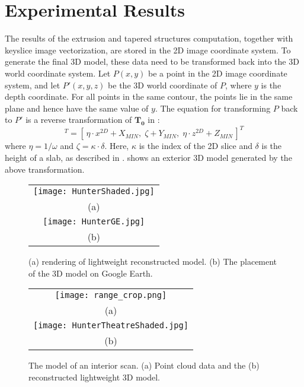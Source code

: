 

\section{Experimental Results}
\label{sec:IR_OUT}

The results of the extrusion and tapered structures computation,
together with keyslice image vectorization, are stored in the 2D
image coordinate system. To generate the final 3D model, these
data need to be transformed back into the 3D world coordinate system.
Let $P(x,y)$ be a point in the 2D image coordinate system, and let $P'(x,y,z)$
be the 3D world coordinate of $P$, where $y$ is the depth coordinate.
For all points in the same contour, the points lie in the same plane and
hence have the same value of $y$.
The equation for transforming $P$ back to $P'$ is a reverse transformation
of $\boldsymbol{T_0}$ in :
\begin{equation}
[\,x^{3D},\; y^{3D},\; z^{3D}\,]^T = [\,\eta\cdot x^{2D} + X_{MIN},\; \zeta + Y_{MIN},\; \eta\cdot z^{2D} + Z_{MIN}\,]^T
\label{eq:ir2dxf}
\end{equation}
where $\eta=1/\omega$ and $\zeta=\kappa\cdot\delta$. Here, $\kappa$ is the
index of the 2D slice and $\delta$ is the height of a slab, as described
in .
 shows an exterior 3D model generated by the above
transformation.

\begin{figure*}[htbp]
\begin{center}
\begin{tabular}{c}
\texttt{[image: HunterShaded.jpg]} \\
(a) \\
\texttt{[image: HunterGE.jpg]} \\
(b)
\end{tabular}
\end{center}
\caption{ (a) rendering of lightweight reconstructed model.
(b) The placement of the 3D model on Google Earth.}
\label{fig:OUT}
\end{figure*}

\begin{figure*}[htbp]
\begin{center}
\begin{tabular}{c}
\texttt{[image: range\_crop.png]} \\
(a) \\
\texttt{[image: HunterTheatreShaded.jpg]} \\
(b)
\end{tabular}
\end{center}
\caption{The model of an interior scan. (a) Point cloud data and the
(b) reconstructed lightweight 3D model.}
\label{fig:IN}
\end{figure*}

